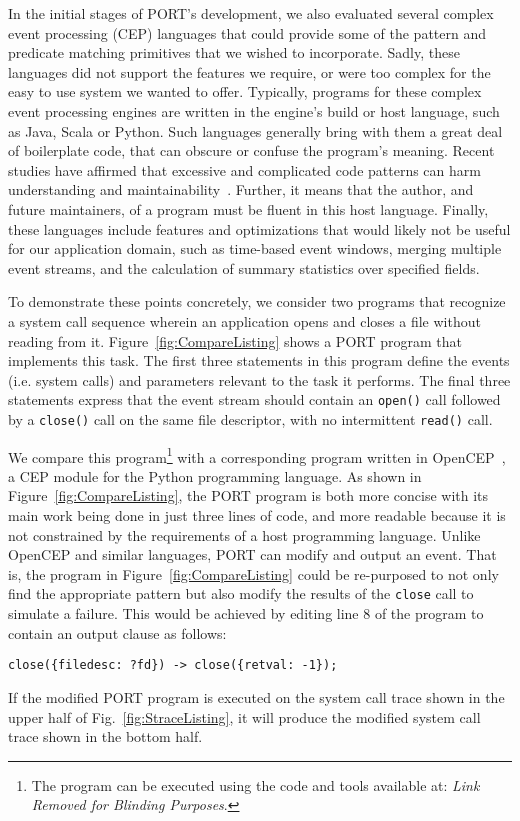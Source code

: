 In the initial stages of PORT's development, we also
evaluated several
complex event processing (CEP) languages that
could
provide some of the pattern and predicate matching primitives
that we wished to
incorporate.
Sadly,
these languages did not
support  the features
we require,
or were too complex
for the easy to use  system we wanted to offer.
Typically,
programs for these complex event processing engines are
written in the engine's build or host language,
such as Java,
Scala or
Python.
Such languages generally bring with them a great deal of boilerplate code,
that can obscure or confuse
the program's meaning.
Recent studies
have affirmed that excessive and complicated code
patterns can harm
understanding and
maintainability~\cite{misunderstandings}.
Further,
it means that the author,
and future maintainers,
of a
program must be fluent in this host language.
Finally,
these languages include features and optimizations
that would likely not be useful for our application domain, such as time-based event windows,
merging multiple event streams,
and the calculation of
summary statistics over specified fields. 


To demonstrate these points concretely,
we consider two programs that recognize a system call sequence wherein an
application opens and closes a file
without reading from it.
Figure~\ref{fig:CompareListing} shows a PORT program that implements this
task.  The first three statements in this program define the events (i.e.
system calls) and parameters relevant to the task it performs.  The final three statements express that the event stream
should contain an \texttt{open()} call followed by a \texttt{close()} call on the same file descriptor, with no intermittent \texttt{read()} call.

We compare this program\footnote{The program can be executed using the code and tools available at: \textit{Link Removed for Blinding Purposes}.}
with a corresponding program written in OpenCEP~\cite{open_cep_website},
a CEP module for the Python programming language.
As shown in Figure~\ref{fig:CompareListing},
the PORT program is both more concise with its main work being done in just
three lines of code, and more readable because it is not constrained by the
requirements of a host programming language.
Unlike  OpenCEP and similar languages, PORT can modify and output an event.
That is, the program in Figure~\ref{fig:CompareListing} could be
re-purposed to not only find the appropriate pattern but also modify the
results of the {\tt close} call to simulate a failure.
This would be achieved
by editing line 8 of the program to contain an output
clause as follows:
\begin{lstlisting}[numbers=none,xleftmargin=0em,gobble=2,columns=strict]
  close({filedesc: ?fd}) -> close({retval: -1});
\end{lstlisting}
If the modified PORT program is executed on the system call trace shown in the upper half of Fig.~\ref{fig:StraceListing}, it will produce the modified system call trace shown in the bottom half.

